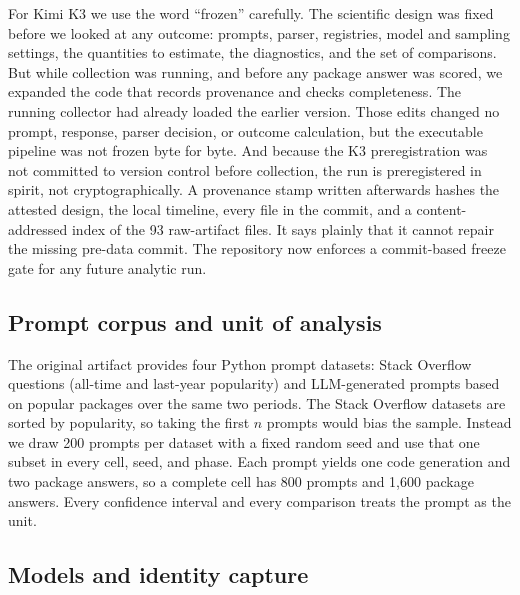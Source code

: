 \documentclass[10pt,twocolumn,letterpaper]{article}
\begin{document}
For Kimi K3 we use the word ``frozen'' carefully. The scientific design was fixed before we looked at
any outcome: prompts, parser, registries, model and sampling settings, the quantities to estimate,
the diagnostics, and the set of comparisons. But while collection was running, and before any package
answer was scored, we expanded the code that records provenance and checks completeness. The running
collector had already loaded the earlier version. Those edits changed no prompt, response, parser
decision, or outcome calculation, but the executable pipeline was not frozen byte for byte. And
because the K3 preregistration was not committed to version control before collection, the run is
preregistered in spirit, not cryptographically. A provenance stamp written afterwards hashes the
attested design, the local timeline, every file in the commit, and a content-addressed index of the 93
raw-artifact files. It says plainly that it cannot repair the missing pre-data commit. The repository
now enforces a commit-based freeze gate for any future analytic run.

\subsection{Prompt corpus and unit of analysis}

The original artifact provides four Python prompt datasets: Stack Overflow questions (all-time and
last-year popularity) and LLM-generated prompts based on popular packages over the same two periods.
The Stack Overflow datasets are sorted by popularity, so taking the first $n$ prompts would bias the
sample. Instead we draw 200 prompts per dataset with a fixed random seed and use that one subset in
every cell, seed, and phase. Each prompt yields one code generation and two package answers, so a
complete cell has 800 prompts and 1,600 package answers. Every confidence interval and every
comparison treats the prompt as the unit.

\subsection{Models and identity capture}
\label{sec:models}
\end{document}
